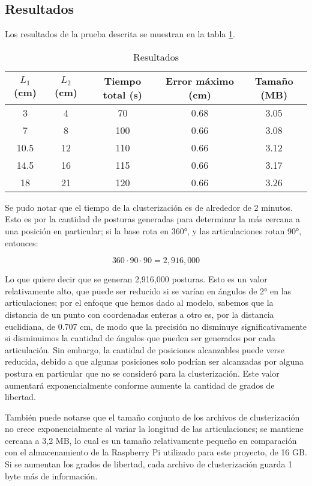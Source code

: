 \subsection{Resultados}

Los resultados de la prueba descrita se muestran en la tabla \ref{tab:Resultados}.

\begin{table}[ht]
	\centering
	\begin{tabular}{|c|c|c|c|c|}
		\hline
		\textbf{$L_1$ (cm)} & \textbf{$L_2$ (cm)} & \textbf{Tiempo total (s)} & \textbf{Error máximo (cm)} & \textbf{Tamaño (MB)} \\
		\hline
		3 & 4 & 70 & 0.68 & 3.05 \\
		7 & 8 & 100 & 0.66 & 3.08 \\
		10.5 & 12 & 110 & 0.66 & 3.12 \\
		14.5 & 16 & 115 & 0.66 & 3.17 \\
		18 & 21 & 120 & 0.66 & 3.26 \\
		\hline
	\end{tabular}
	\caption{Resultados}
	\label{tab:Resultados}
\end{table}

Se pudo notar que el tiempo de la clusterización es de alrededor de 2 minutos. Esto es por la cantidad de posturas generadas para determinar la más cercana a una posición en particular; si la base rota en 360°, y las articulaciones rotan 90°, entonces:

\begin{equation}
	360 \cdot 90 \cdot 90 = 2,916,000
\end{equation}

Lo que quiere decir que se generan 2,916,000 posturas. Esto es un valor relativamente alto, que puede ser reducido si se varían en ángulos de 2° en las articulaciones; por el enfoque que hemos dado al modelo, sabemos que la distancia de un punto con coordenadas enteras a otro es, por la distancia euclidiana, de 0.707 cm, de modo que la precisión no disminuye significativamente si disminuimos la cantidad de ángulos que pueden ser generados por cada articulación. Sin embargo, la cantidad de posiciones alcanzables puede verse reducida, debido a que algunas posiciones solo podrían ser alcanzadas por alguna postura en particular que no se consideró para la clusterización. Este valor aumentará exponencialmente conforme aumente la cantidad de grados de libertad.

También puede notarse que el tamaño conjunto de los archivos de clusterización no crece exponencialmente al variar la longitud de las articulaciones; se mantiene cercana a 3,2 MB, lo cual es un tamaño relativamente pequeño en comparación con el almacenamiento de la Raspberry Pi utilizado para este proyecto, de 16 GB. Si se aumentan los grados de libertad, cada archivo de clusterización guarda 1 byte más de información.